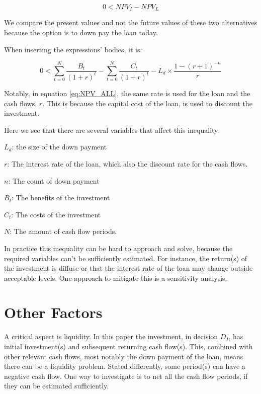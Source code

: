 \documentclass[a4paper]{article}
\begin{document}
\begin{equation}
0 < NPV_I - NPV_L
\end{equation}

We compare the present values and not the future values of these two
alternatives because the option is to down pay the loan today.

When inserting the expressions' bodies, it is:

\begin{equation}
\label{eq:NPV_ALL}
0 < {\sum_{t=0}^{N} \frac{B_t}{(1 + r)^t} -
     \sum_{t=0}^{N} \frac{C_t}{(1 + r)^t}}
     - L_d \times \frac{1 - (r + 1)^{-n}}{r}
\end{equation}

Notably, in equation \ref{eq:NPV_ALL}, the same rate is used for the loan and
the cash flows, $r$. This is because the capital cost of the loan, is used to
discount the investment.

Here we see that there are several variables that affect this inequality:

$L_d$: the size of the down payment

$r$: The interest rate of the loan, which also the discount rate for the cash
flows.

$n$: The count of down payment

$B_t$: The benefits of the investment

$C_t$: The costs of the investment

$N$: The amount of cash flow periods.

In practice this inequality can be hard to approach and solve, because the
required variables can't be sufficiently estimated. For instance, the return(s)
of the investment is diffuse or that the interest rate of the loan may change
outside acceptable levels. One approach to mitigate this is a sensitivity
analysis.

\section{Other Factors}

A critical aspect is liquidity. In this paper the investment, in decision $D_I$,
has initial investment(s) and subsequent returning cash flow(s). This, combined
with other relevant cash flows, most notably the down payment of the loan, means
there can be a liquidity problem. Stated differently, some period(s) can have a
negative cash flow. One way to investigate is to net all the cash flow periods,
if they can be estimated sufficiently.
\end{document}
